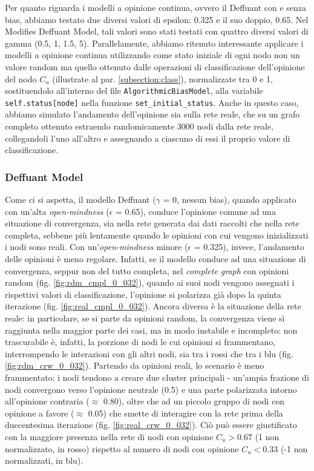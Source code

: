     Per quanto riguarda i modelli a opinione continua, ovvero il Deffuant con e senza bias, abbiamo testato due diversi valori di epsilon: 0.325 e il suo doppio, 0.65. Nel Modifies Deffuant Model, tali valori sono stati testati con quattro diversi valori di gamma (0.5, 1, 1.5, 5).
    Parallelamente, abbiamo ritenuto interessante applicare i modelli a opinione continua utilizzando come stato iniziale di ogni nodo non un valore random ma quello ottenuto dalle operazioni di classificazione dell'opinione del nodo $C_{u}$ (illustrate al par. \ref{subsection:class}), normalizzate tra 0 e 1, sostituendolo all’interno del file \texttt{AlgorithmicBiasModel}, alla variabile \texttt{self.status[node]} nella funzione \texttt{set\_initial\_status}. Anche in questo caso, abbiamo simulato l’andamento dell’opinione sia sulla rete reale, che su un grafo completo ottenuto estraendo randomicamente 3000 nodi dalla rete reale, collegandoli l’uno all’altro e assegnando a ciascuno di essi il proprio valore di classificazione.
    
    \subsubsection{Deffuant Model}
    Come ci si aspetta, il modello Deffuant ($\gamma$ = 0, nessun bias), quando applicato con un'alta \textit{open-mindness} ($\epsilon$ = 0.65), conduce l’opinione comune ad una situazione di convergenza, sia nella rete generata dai dati raccolti che nella rete completa, sebbene più lentamente quando le opinioni con cui vengono inizializzati i nodi sono reali. Con un'\textit{open-mindness} minore ($\epsilon$ = 0.325), invece, l'andamento delle opinioni è meno regolare. Infatti, se il modello conduce ad una situazione di convergenza, seppur non del tutto completa, nel \textit{complete graph} con opinioni random (fig. \ref{fig:rdm_cmpl_0_032}), quando ai suoi nodi vengono assegnati i rispettivi valori di classificazione, l'opinione si polarizza già dopo la quinta iterazione (fig. \ref{fig:real_cmpl_0_032}).
    Ancora diversa è la situazione della rete reale: in particolare, se si parte da opinioni random, la convergenza viene sì raggiunta nella maggior parte dei casi, ma in modo instabile e incompleto: non trascurabile è, infatti, la porzione di nodi le cui opinioni si frammentano, interrompendo le interazioni con gli altri nodi, sia tra i rossi che tra i blu (fig. \ref{fig:rdm_crw_0_032}). Partendo da opinioni reali, lo scenario è meno frammentato: i nodi tendono a creare due cluster principali - un'ampia frazione di nodi convergono verso l'opinione neutrale (0.5) e una parte polarizzata intorno all'opinione contraria ($\approx$ 0.80), oltre che ad un piccolo gruppo di nodi con opinione a favore ($\approx$ 0.05) che smette di interagire con la rete prima della duecentesima iterazione (fig. \ref{fig:real_crw_0_032}). Ciò può essere giustificato con la maggiore presenza nella rete di nodi con opinione $C_{u}>0.67$ (1 non normalizzato, in rosso) rispetto al numero di nodi con opinione $C_{u}<0.33$ (-1 non normalizzati, in blu). 
    
